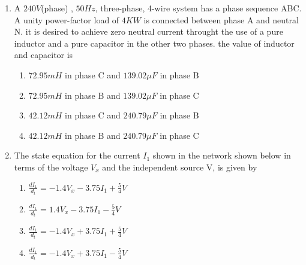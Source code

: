 \documentclass[journal,12pt,onecolumn]{IEEEtran}
\theoremstyle{remark}
\begin{document}
\begin{enumerate}
\item A $240 V$(phase) , $50 Hz$, three-phase, 4-wire system has a phase sequence ABC. A unity power-factor load of $4 KW$ is connected between phase A and neutral N. it is desired to achieve zero neutral current throught the use of a pure inductor and a pure capacitor in the other two phases. the value of inductor and capacitor is 
\begin{enumerate}
    \item $72.95 mH$ in phase C and $139.02 \mu F$ in phase B
    \item $72.95 mH$ in phase B and $139.02 \mu F$ in phase C
    \item $42.12 mH$ in phase C and $240.79 \mu F$ in phase B
    \item $42.12 mH$ in phase B and $240.79 \mu F$ in phase C \\
\end{enumerate}

\item The state equation for the current $I_1$ shown in the network shown below in terms of the voltage $V_x$ and the independent source V, is given by \\



\begin{figure}[!ht]
\centering
{}%

\label{fig:my_label}
\end{figure}

\begin{enumerate}
    \item $\frac{dI_1}{d_t}=-1.4V_x-3.75I_1+\frac{5}{4}V$
    \item $\frac{dI_1}{d_t}=1.4V_x-3.75I_1-\frac{5}{4}V$
    \item $\frac{dI_1}{d_t}=-1.4V_x+3.75I_1+\frac{5}{4}V$
    \item $\frac{dI_1}{d_t}=-1.4V_x+3.75I_1-\frac{5}{4}V$
\end{enumerate}


\end{enumerate}
\end{document}
